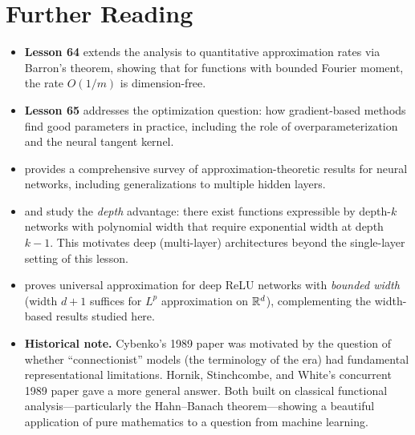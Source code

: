 \documentclass[11pt,a4paper]{article}
\begin{document}
\section{Further Reading}
\label{sec:further-reading}

\begin{itemize}
  \item \textbf{Lesson 64} extends the analysis to quantitative
    approximation rates via Barron's theorem, showing that for functions
    with bounded Fourier moment, the rate $O(1/m)$ is dimension-free.

  \item \textbf{Lesson 65} addresses the optimization question: how
    gradient-based methods find good parameters in practice, including
    the role of overparameterization and the neural tangent kernel.

  \item \citet{pinkus1999} provides a comprehensive survey of
    approximation-theoretic results for neural networks, including
    generalizations to multiple hidden layers.

  \item \citet{telgarsky2016} and \citet{eldan2016} study the
    \emph{depth} advantage: there exist functions expressible by depth-$k$
    networks with polynomial width that require exponential width at depth
    $k-1$.  This motivates deep (multi-layer) architectures beyond the
    single-layer setting of this lesson.

  \item \citet{hanin2019} proves universal approximation for deep ReLU
    networks with \emph{bounded width} (width $d+1$ suffices for
    $L^p$ approximation on $\mathbb{R}^d$), complementing the width-based
    results studied here.

  \item \textbf{Historical note.}  Cybenko's 1989 paper was motivated by
    the question of whether ``connectionist'' models (the terminology of
    the era) had fundamental representational limitations.  Hornik,
    Stinchcombe, and White's concurrent 1989 paper gave a more general
    answer.  Both built on classical functional analysis---particularly
    the Hahn--Banach theorem---showing a beautiful application of pure
    mathematics to a question from machine learning.
\end{itemize}


\end{document}
